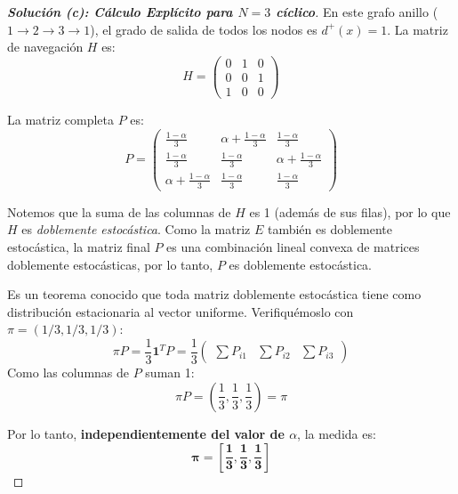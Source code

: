 \documentclass[10pt,a4paper]{article}
\begin{document}
\vspace{5mm}

\begin{proof}[\textbf{Solución (c): Cálculo Explícito para $N=3$ cíclico}]
    En este grafo anillo ($1 \to 2 \to 3 \to 1$), el grado de salida de todos los nodos es $d^+(x) = 1$. La matriz de navegación $H$ es:
    \[ H = \begin{pmatrix} 0 & 1 & 0 \\ 0 & 0 & 1 \\ 1 & 0 & 0 \end{pmatrix} \]
    
    La matriz completa $P$ es:
    \[ P = \begin{pmatrix} \frac{1-\alpha}{3} & \alpha + \frac{1-\alpha}{3} & \frac{1-\alpha}{3} \\ \frac{1-\alpha}{3} & \frac{1-\alpha}{3} & \alpha + \frac{1-\alpha}{3} \\ \alpha + \frac{1-\alpha}{3} & \frac{1-\alpha}{3} & \frac{1-\alpha}{3} \end{pmatrix} \]
    
    Notemos que la suma de las columnas de $H$ es 1 (además de sus filas), por lo que $H$ es \textit{doblemente estocástica}. Como la matriz $E$ también es doblemente estocástica, la matriz final $P$ es una combinación lineal convexa de matrices doblemente estocásticas, por lo tanto, $P$ es doblemente estocástica.
    
    Es un teorema conocido que toda matriz doblemente estocástica tiene como distribución estacionaria al vector uniforme. Verifiquémoslo con $\pi = (1/3, 1/3, 1/3)$:
    \[ \pi P = \frac{1}{3} \mathbf{1}^T P = \frac{1}{3} \begin{pmatrix} \sum P_{i1} & \sum P_{i2} & \sum P_{i3} \end{pmatrix} \]
    Como las columnas de $P$ suman 1:
    \[ \pi P = \left( \frac{1}{3}, \frac{1}{3}, \frac{1}{3} \right) = \pi \]
    
    Por lo tanto, \textbf{independientemente del valor de $\alpha$}, la medida es:
    \[ \mathbf{\pi = \left[ \frac{1}{3}, \frac{1}{3}, \frac{1}{3} \right]} \]
\end{proof}

\vspace{5mm}
\end{document}
